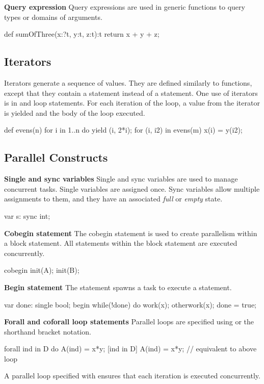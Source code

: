 \documentclass[landscape]{report}
\begin{document}
{{\bf Query expression} \newline
Query expressions are used in generic functions to query
types or domains of arguments.
\begin{chapel}
def sumOfThree(x:?t, y:t, z:t):t {
   return x + y + z;
}
\end{chapel}
\subsection*{Iterators}
Iterators generate a sequence of values.  They are defined similarly 
to functions, except that they contain a  statement
instead of a  statement.  
One use of iterators is in  and  loop
statements.  For each iteration of the loop, a value from the
iterator is yielded and the body of the loop executed.
\begin{chapel}
def evens(n) {
  for i in 1..n do yield (i, 2*i);
}
for (i, i2) in evens(m) {
  x(i) = y(i2);
}
\end{chapel}
\subsection*{Parallel Constructs}
{\bf Single and sync variables} \newline
Single and sync variables are used to manage concurrent
tasks.  Single variables are assigned once.  
Sync variables allow multiple assignments to them, and
they have an associated {\em full} or {\em empty} state. 
\begin{chapel}
var s: sync int;
\end{chapel}
{\bf Cobegin statement} \newline
The cobegin statement is used to create parallelism within
a block statement.  All statements within the block statement
are executed concurrently.
\begin{chapel}
cobegin {
  init(A);
  init(B);
}
\end{chapel}
{\bf Begin statement} \newline
The  statement spawns a task to execute a 
statement.
\begin{chapel}
var done: single bool;
begin 
  while(!done) do work(x); 
otherwork(x);
done = true;
\end{chapel}
{\bf Forall  and coforall loop statements} \newline
Parallel loops are specified using  or
the shorthand bracket notation.
\begin{chapel}
forall ind in D do A(ind) = x*y;
[ind in D] A(ind) = x*y; // equivalent to above loop
\end{chapel}
A parallel loop specified with  ensures
that each iteration is executed concurrently.

}
\end{document}
